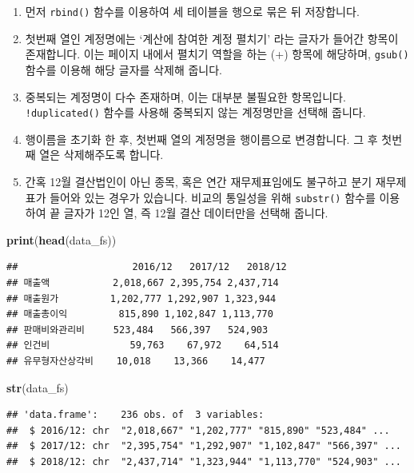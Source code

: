 \documentclass[]{book}
\newenvironment{Shaded}{\begin{snugshade}}{\end{snugshade}}
\newcommand{\KeywordTok}[1]{\textcolor[rgb]{0.13,0.29,0.53}{\textbf{#1}}}
\newcommand{\NormalTok}[1]{#1}
\providecommand{\tightlist}{%
  \setlength{\itemsep}{0pt}\setlength{\parskip}{0pt}}
\begin{document}
\begin{enumerate}
\def\labelenumi{\arabic{enumi}.}
\tightlist
\item
  먼저 \texttt{rbind()} 함수를 이용하여 세 테이블을 행으로 묶은 뒤 저장합니다.
\item
  첫번째 열인 계정명에는 `계산에 참여한 계정 펼치기' 라는 글자가 들어간 항목이 존재합니다. 이는 페이지 내에서 펼치기 역할을 하는 (+) 항목에 해당하며, \texttt{gsub()} 함수를 이용해 해당 글자를 삭제해 줍니다.
\item
  중복되는 계정명이 다수 존재하며, 이는 대부분 불필요한 항목입니다. \texttt{!duplicated()} 함수를 사용해 중복되지 않는 계정명만을 선택해 줍니다.
\item
  행이름을 초기화 한 후, 첫번째 열의 계정명을 행이름으로 변경합니다. 그 후 첫번째 열은 삭제해주도록 합니다.
\item
  간혹 12월 결산법인이 아닌 종목, 혹은 연간 재무제표임에도 불구하고 분기 재무제표가 들어와 있는 경우가 있습니다. 비교의 통일성을 위해 \texttt{substr()} 함수를 이용하여 끝 글자가 12인 열, 즉 12월 결산 데이터만을 선택해 줍니다.
\end{enumerate}

\begin{Shaded}
\begin{Highlighting}[]
\KeywordTok{print}\NormalTok{(}\KeywordTok{head}\NormalTok{(data_fs))}
\end{Highlighting}
\end{Shaded}

\begin{verbatim}
##                    2016/12   2017/12   2018/12
## 매출액           2,018,667 2,395,754 2,437,714
## 매출원가         1,202,777 1,292,907 1,323,944
## 매출총이익         815,890 1,102,847 1,113,770
## 판매비와관리비     523,484   566,397   524,903
## 인건비              59,763    67,972    64,514
## 유무형자산상각비    10,018    13,366    14,477
\end{verbatim}

\begin{Shaded}
\begin{Highlighting}[]
\KeywordTok{str}\NormalTok{(data_fs)}
\end{Highlighting}
\end{Shaded}

\begin{verbatim}
## 'data.frame':    236 obs. of  3 variables:
##  $ 2016/12: chr  "2,018,667" "1,202,777" "815,890" "523,484" ...
##  $ 2017/12: chr  "2,395,754" "1,292,907" "1,102,847" "566,397" ...
##  $ 2018/12: chr  "2,437,714" "1,323,944" "1,113,770" "524,903" ...
\end{verbatim}
\end{document}
